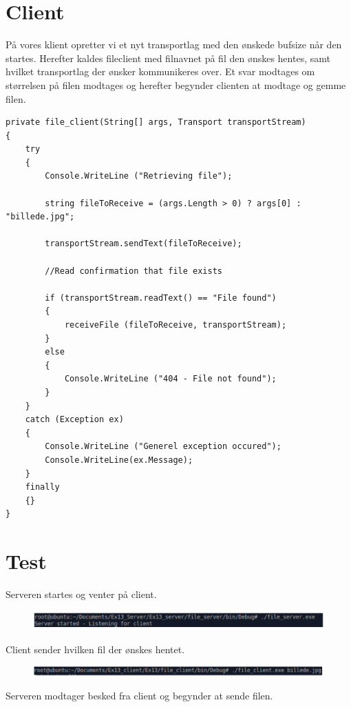 \section{Client}

På vores klient opretter vi et nyt transportlag med den ønskede bufsize når den startes. Herefter kaldes fileclient med filnavnet på fil den ønskes hentes, samt hvilket transportlag der ønsker kommunikeres over. Et svar modtages om størrelsen på filen modtages og herefter begynder clienten at modtage og gemme filen.

\begin{lstlisting}
private file_client(String[] args, Transport transportStream)
{
	try
	{
		Console.WriteLine ("Retrieving file");
		
		string fileToReceive = (args.Length > 0) ? args[0] : "billede.jpg";
		
		transportStream.sendText(fileToReceive);
		
		//Read confirmation that file exists
		
		if (transportStream.readText() == "File found") 
		{
			receiveFile (fileToReceive, transportStream);
		} 
		else 
		{
			Console.WriteLine ("404 - File not found");
		}
	}
	catch (Exception ex)
	{
		Console.WriteLine ("Generel exception occured");
		Console.WriteLine(ex.Message);
	}
	finally 
	{}
}
\end{lstlisting}

\section{Test}
Serveren startes og venter på client.

\begin{figure}[H]
	\centering
	\includegraphics[width=\linewidth]{figs/test1}
	\caption{}
	\label{fig:test1}
\end{figure}

Client sender hvilken fil der ønskes hentet.

\begin{figure}[H]
	\centering
	\includegraphics[width=\linewidth]{figs/test2}
	\caption{}
	\label{fig:test2}
\end{figure}

Serveren modtager besked fra client og begynder at sende filen.

